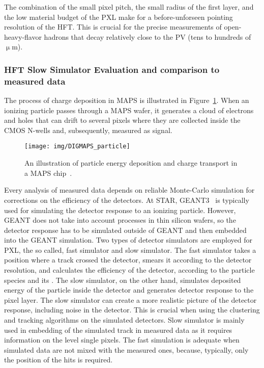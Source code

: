The combination of the small pixel pitch, the small radius of the first layer, and the low material budget of the PXL make for a before-unforseen pointing resolution of the HFT\@. This is crucial for the precise measurements of open-heavy-flavor hadrons that decay relatively close to the PV (tens to hundreds of $\upmu$m)\@.  

\subsubsection{HFT Slow Simulator Evaluation and comparison to measured data}
The process of charge deposition in MAPS is illustrated in Figure~\ref{DigmapsIllustration}\@.
When an ionizing particle passes through a MAPS wafer, it generates a cloud of electrons and holes that can drift to several pixels where they are collected inside the CMOS N-wells and, subsequently, measured as signal.  

\begin{figure}[!htb]
\begin{center}
 \texttt{[image: img/DIGMAPS\_particle]}\\
\end{center}
\caption{\label{DigmapsIllustration}An illustration of particle energy deposition and charge transport in a MAPS chip~\cite{DIGMAPS}.}
\end{figure}

Every analysis of measured data depends on reliable Monte-Carlo simulation for corrections on the efficiency of the detectors. At STAR, GEANT3~\cite{GEANT} is typically used for simulating the detector response to an ionizing particle. However, GEANT does not take into account processes in thin silicon wafers, so the detector response has to be simulated outside of GEANT and then embedded into the GEANT simulation. Two types of detector simulators are employed for PXL, the so called, fast simulator and slow simulator. The fast simulator takes a position where a track crossed the detector, smears it according to the detector resolution, and calculates the efficiency of the detector, according to the particle species and its \pt\@. The slow simulator, on the other hand, simulates deposited energy of the particle inside the detector and generates detector response to the pixel layer. The slow simulator can create a more realistic picture of the detector response, including noise in the detector. This is crucial when using the clustering and tracking algorithms on the simulated detectors. Slow simulator is mainly used in embedding of the simulated track in measured data as it requires information on the level single pixels. The fast simulation is adequate when simulated data are not mixed with the measured ones, because, typically, only the position of the hits is required.


